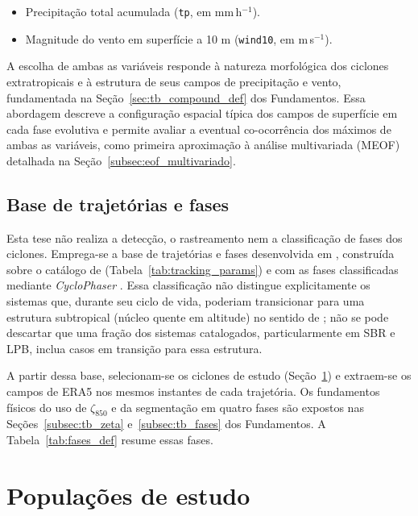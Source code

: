 \begin{itemize}
    \item Precipitação total acumulada (\texttt{tp}, em mm\,h$^{-1}$).
    \item Magnitude do vento em superfície a 10 m (\texttt{wind10}, em m\,s$^{-1}$).
\end{itemize}

A escolha de ambas as variáveis responde à natureza morfológica dos ciclones extratropicais e à estrutura de seus campos de precipitação e vento, fundamentada na Seção~\ref{sec:tb_compound_def} dos Fundamentos.
Essa abordagem descreve a configuração espacial típica dos campos de superfície em cada fase evolutiva e permite avaliar a eventual co-ocorrência dos máximos de ambas as variáveis, como primeira aproximação à análise multivariada (MEOF) detalhada na Seção~\ref{subsec:eof_multivariado}.

\subsection{Base de trajetórias e fases}\label{sec:bd_ciclones}
Esta tese não realiza a detecção, o rastreamento nem a classificação de fases dos ciclones.
Emprega-se a base de trajetórias e fases desenvolvida em \citet{coutodesouza2024thesis}, construída sobre o catálogo de \citet{gramcianinov2020analysis} (Tabela~\ref{tab:tracking_params}) e com as fases classificadas mediante \textit{CycloPhaser} \citep{deSouza2025CycloPhaser}.
Essa classificação não distingue explicitamente os sistemas que, durante seu ciclo de vida, poderiam transicionar para uma estrutura subtropical (núcleo quente em altitude) no sentido de \citet{hart2003cyclone}; não se pode descartar que uma fração dos sistemas catalogados, particularmente em SBR e LPB, inclua casos em transição para essa estrutura.



A partir dessa base, selecionam-se os ciclones de estudo (Seção~\ref{sec:poblaciones_estudio}) e extraem-se os campos de ERA5 nos mesmos instantes de cada trajetória.
Os fundamentos físicos do uso de $\zeta_{850}$ e da segmentação em quatro fases são expostos nas Seções~\ref{subsec:tb_zeta} e~\ref{subsec:tb_fases} dos Fundamentos. A Tabela~\ref{tab:fases_def} resume essas fases.




\section{Populações de estudo}\label{sec:poblaciones_estudio}

